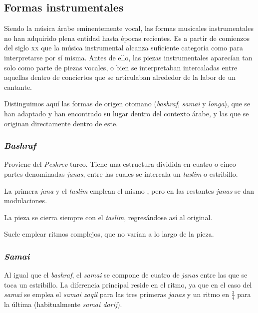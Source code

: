 \subsection{Formas instrumentales}

    Siendo la música árabe eminentemente vocal, las formas musicales instrumentales no han adquirido plena entidad hasta épocas recientes. Es a partir de comienzos del siglo \textsc{xx} que la música instrumental alcanza suficiente categoría como para interpretarse por sí misma. Antes de ello, las piezas instrumentales aparecían tan solo como parte de piezas vocales, o bien se interpretaban intercaladas entre aquellas dentro de conciertos que se articulaban alrededor de la labor de un cantante.

    Distinguimos aquí las formas de origen otomano (\emph{bashraf}, \emph{samai} y \emph{longa}), que se han adaptado y han encontrado su lugar dentro del contexto árabe, y las que se originan directamente dentro de este.

    \subsubsection{\emph{Bashraf}}

        Proviene del \emph{Peshrev} turco. Tiene una estructura dividida en cuatro o cinco partes denominadas \emph{janas}, entre las cuales se intercala un \emph{taslim} o estribillo.

        La primera \emph{jana} y el \emph{taslim} emplean el mismo \maqamb, pero en las restantes \emph{janas} se dan modulaciones.

        La pieza se cierra siempre con el \emph{taslim}, regresándose así al \maqam original.

        Suele emplear ritmos complejos, que no varían a lo largo de la pieza.


    \subsubsection{\emph{Samai}}

        Al igual que el \emph{bashraf}, el \emph{samai} se compone de cuatro de \emph{janas} entre las que se toca un estribillo. La diferencia principal reside en el ritmo, ya que en el caso del \emph{samai} se emplea el \emph{samai zaqil} para las tres primeras \emph{janas} y un ritmo en $\frac{3}{4}$ para la última (habitualmente \emph{samai darij}).

